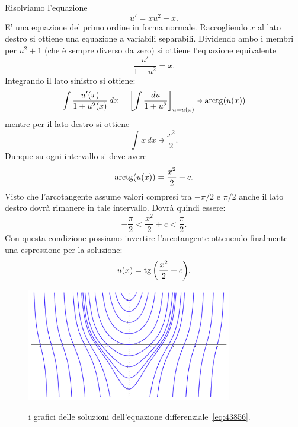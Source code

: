 \begin{example}
Risolviamo l'equazione
\begin{equation}\label{eq:43856}
  u' = x u^2 + x.
\end{equation}
E' una equazione del primo ordine in forma normale.
Raccogliendo $x$ al lato destro si ottiene una equazione a variabili separabili.
Dividendo ambo i membri per $u^2+1$ (che è sempre diverso da zero) si ottiene l'equazione equivalente
\[
\frac{u'}{1+u^2} = x.
\]
Integrando il lato sinistro si ottiene:
\[
  \int \frac{u'(x)}{1+u^2(x)}\, dx
  = {\left[ \int \frac{du}{1+u^2} \right]}_{u=u(x)}
  \ni \operatorname{arctg}(u(x))
\]
mentre per il lato destro si ottiene
\[
  \int x\, dx \ni \frac{x^2}{2}.
\]
Dunque su ogni intervallo si deve avere
\[
  \operatorname{arctg}(u(x)) = \frac{x^2}{2} + c.
\]
Visto che l'arcotangente assume valori compresi tra $-\pi/2$ e $\pi/2$ anche il lato destro dovrà rimanere in tale intervallo. Dovrà quindi essere:
\begin{equation}\label{eq:4856}
  -\frac \pi 2 < \frac {x^2} 2 + c < \frac \pi 2 .
\end{equation}
Con questa condizione possiamo invertire l'arcotangente ottenendo finalmente una espressione per la soluzione:
\begin{equation}\label{eq:45876314}
  u(x) = \operatorname{tg}{\left( \frac{x^2}{2} + c \right)}.
\end{equation}

\newsavebox{\qrquattrotre}
\begin{figure}
\centering
\includegraphics[width=0.8\textwidth]{fig_43856.pdf}
\label{fig:43856}
\caption{i grafici delle soluzioni dell'equazione differenziale~\eqref{eq:43856}.
\ifwidemargin\\\\\fi%
\usebox{\qrquattrotre}}
\end{figure}


\end{example}
